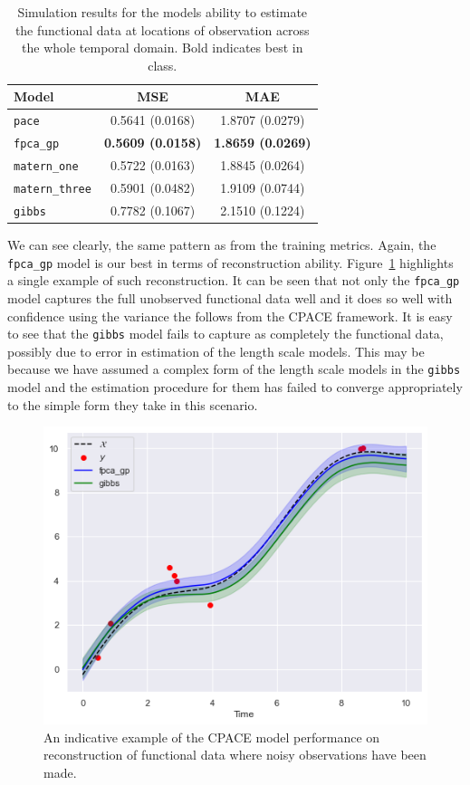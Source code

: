 \begin{table}
	\caption[Simulation results for Scenario A on validation data]{Simulation results for the models ability to estimate the functional data at locations of observation across the whole temporal domain. Bold indicates best in class.}
	\centering
	\label{tab:val_A}
	\begin{tabular}{lcc}
		\toprule
		\textbf{Model} & \textbf{MSE} & \textbf{MAE} \\
		\midrule
		\verb*|pace| & 0.5641 (0.0168) & 1.8707	(0.0279) \\
		\verb*|fpca_gp| & \textbf{0.5609 (0.0158)} & \textbf{1.8659 (0.0269)} \\
		\verb*|matern_one| & 0.5722	(0.0163) & 1.8845 (0.0264) \\
		\verb*|matern_three| & 0.5901 (0.0482) & 1.9109	(0.0744) \\
		\verb*|gibbs| & 0.7782 (0.1067) & 2.1510 (0.1224)\\
		\bottomrule
	\end{tabular}
\end{table}

We can see clearly, the same pattern as from the training metrics. 
Again, the \verb*|fpca_gp| model is our best in terms of reconstruction ability.
Figure~\ref{fig:val_ex_A} highlights a single example of such reconstruction.
It can be seen that not only the \verb*|fpca_gp| model captures the full unobserved functional data well and it does so well with confidence using the variance the follows from the CPACE framework.
It is easy to see that the \verb*|gibbs| model fails to capture as completely the functional data, possibly due to error in estimation of the  length scale models.
This may be because we have assumed a complex form of the length scale models in the \verb*|gibbs| model and the estimation procedure for them has failed to converge appropriately to the simple form they take in this scenario.

 \begin{figure}
 	\centering
 	\includegraphics[width=\textwidth]{ex_val_A}
 	\caption{An indicative example of the CPACE model performance on reconstruction of functional data where noisy observations have been made.}
 	\label{fig:val_ex_A}
 \end{figure}

